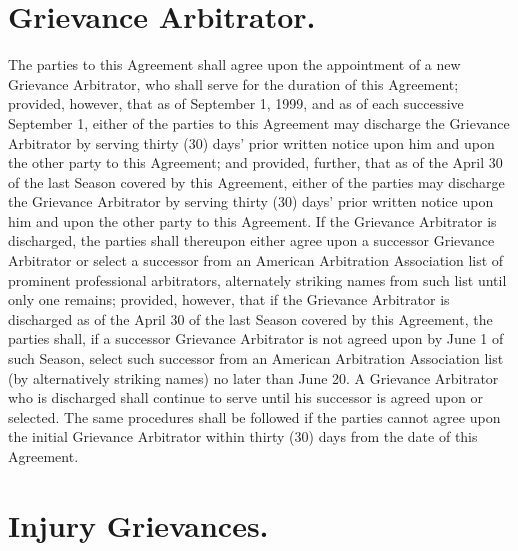 \documentclass[
]{book}
\begin{document}
\hypertarget{grievance-arbitrator.}{%
\section{Grievance Arbitrator.}\label{grievance-arbitrator.}}

The parties to this Agreement shall agree upon the appointment of a new Grievance Arbitrator, who shall serve for the duration of this Agreement; provided, however, that as of September 1, 1999, and as of each successive September 1, either of the parties to this Agreement may discharge the Grievance Arbitrator by serving thirty (30) days' prior written notice upon him and upon the other party to this Agreement; and provided, further, that as of the April 30 of the last Season covered by this Agreement, either of the parties may discharge the Grievance Arbitrator by serving thirty (30) days' prior written notice upon him and upon the other party to this Agreement. If the Grievance Arbitrator is discharged, the parties shall thereupon either agree upon a successor Grievance Arbitrator or select a successor from an American Arbitration Association list of prominent professional arbitrators, alternately striking names from such list until only one remains; provided, however, that if the Grievance Arbitrator is discharged as of the April 30 of the last Season covered by this Agreement, the parties shall, if a successor Grievance Arbitrator is not agreed upon by June 1 of such Season, select such successor from an American Arbitration Association list (by alternatively striking names) no later than June 20. A Grievance Arbitrator who is discharged shall continue to serve until his successor is agreed upon or selected. The same procedures shall be followed if the parties cannot agree upon the initial Grievance Arbitrator within thirty (30) days from the date of this Agreement.

\hypertarget{injury-grievances.}{%
\section{Injury Grievances.}\label{injury-grievances.}}
\end{document}
